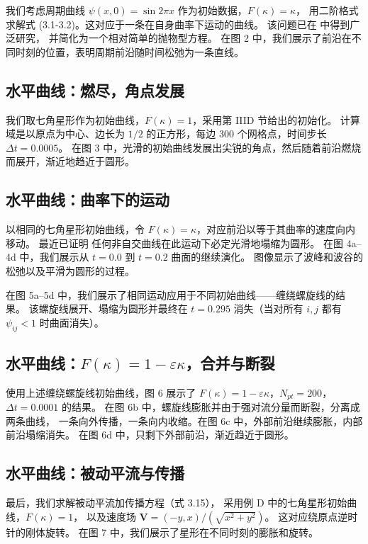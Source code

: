 \documentclass[11pt,a4paper]{article}
\begin{document}
我们考虑周期曲线 $\psi(x,0) = \sin 2\pi x$ 作为初始数据，$F(\kappa) = \kappa$，
用二阶格式求解式 (3.1-3.2)。这对应于一条在自身曲率下运动的曲线。
该问题已在 \cite{gage1983, gage1984, gage1986, grayson1987} 中得到广泛研究，
并简化为一个相对简单的抛物型方程。
在图 2 中，我们展示了前沿在不同时刻的位置，表明周期前沿随时间松弛为一条直线。

\subsection{水平曲线：燃尽，角点发展}

我们取七角星形作为初始曲线，$F(\kappa) = 1$，采用第 IIID 节给出的初始化。
计算域是以原点为中心、边长为 $1/2$ 的正方形，每边 300 个网格点，时间步长 $\Delta t = 0.0005$。
在图 3 中，光滑的初始曲线发展出尖锐的角点，然后随着前沿燃烧而展开，渐近地趋近于圆形。

\subsection{水平曲线：曲率下的运动}

以相同的七角星形初始曲线，令 $F(\kappa) = \kappa$，对应前沿以等于其曲率的速度向内移动。
最近已证明 \cite{grayson1987} 任何非自交曲线在此运动下必定光滑地塌缩为圆形。
在图 4a--4d 中，我们展示从 $t=0.0$ 到 $t=0.2$ 曲面的继续演化。
图像显示了波峰和波谷的松弛以及平滑为圆形的过程。

在图 5a--5d 中，我们展示了相同运动应用于不同初始曲线——缠绕螺旋线的结果。
该螺旋线展开、塌缩为圆形并最终在 $t=0.295$ 消失（当对所有 $i,j$ 都有 $\psi_{ij} < 1$ 时曲面消失）。

\subsection{水平曲线：$F(\kappa) = 1 - \varepsilon\kappa$，合并与断裂}

使用上述缠绕螺旋线初始曲线，图 6 展示了 $F(\kappa) = 1 - \varepsilon\kappa$，$N_{pt} = 200$，$\Delta t = 0.0001$ 的结果。
在图 6b 中，螺旋线膨胀并由于强对流分量而断裂，分离成两条曲线，
一条向外传播，一条向内收缩。在图 6c 中，外部前沿继续膨胀，内部前沿塌缩消失。
在图 6d 中，只剩下外部前沿，渐近趋近于圆形。

\subsection{水平曲线：被动平流与传播}

最后，我们求解被动平流加传播方程（式 3.15），
采用例 D 中的七角星形初始曲线，$F(\kappa) = 1$，
以及速度场 $\mathbf{V} = (-y, x)/(\sqrt{x^2 + y^2})$。
这对应绕原点逆时针的刚体旋转。
在图 7 中，我们展示了星形在不同时刻的膨胀和旋转。
\end{document}
